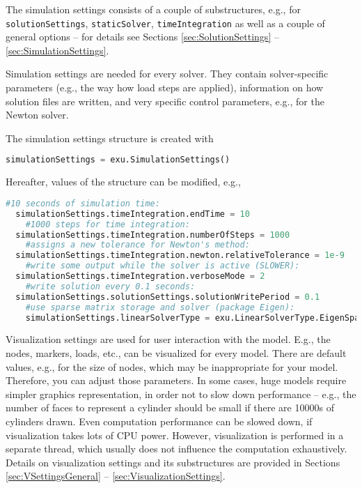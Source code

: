 The simulation settings consists of a couple of substructures, e.g., for \texttt{solutionSettings}, \texttt{staticSolver}, \texttt{timeIntegration} as well as a couple of general options -- for details see Sections \ref{sec:SolutionSettings} -- \ref{sec:SimulationSettings}.

Simulation settings are needed for every solver. They contain solver-specific parameters (e.g., the way how load steps are applied), information on how solution files are written, and very specific control parameters, e.g., for the Newton solver. 

The simulation settings structure is created with 
\pythonstyle
\begin{lstlisting}[language=Python, firstnumber=1]
  simulationSettings = exu.SimulationSettings()
\end{lstlisting}
%
Hereafter, values of the structure can be modified, e.g.,
\begin{lstlisting}[language=Python, firstnumber=1]
	#10 seconds of simulation time:
  simulationSettings.timeIntegration.endTime = 10                    
	#1000 steps for time integration:
  simulationSettings.timeIntegration.numberOfSteps = 1000            
	#assigns a new tolerance for Newton's method:
  simulationSettings.timeIntegration.newton.relativeTolerance = 1e-9 
	#write some output while the solver is active (SLOWER):
  simulationSettings.timeIntegration.verboseMode = 2                 
	#write solution every 0.1 seconds:
  simulationSettings.solutionSettings.solutionWritePeriod = 0.1      
	#use sparse matrix storage and solver (package Eigen):
	simulationSettings.linearSolverType = exu.LinearSolverType.EigenSparse 
\end{lstlisting}

%
Visualization settings are used for user interaction with the model. E.g., the nodes, markers, loads, etc., can be visualized for every model. There are default values, e.g., for the size of nodes, which may be inappropriate for your model. Therefore, you can adjust those parameters. In some cases, huge models require simpler graphics representation, in order not to slow down performance -- e.g., the number of faces to represent a cylinder should be small if there are 10000s of cylinders drawn. Even computation performance can be slowed down, if visualization takes lots of CPU power. However, visualization is performed in a separate thread, which usually does not influence the computation exhaustively.
Details on visualization settings and its substructures are provided in Sections \ref{sec:VSettingsGeneral} -- \ref{sec:VisualizationSettings}.

